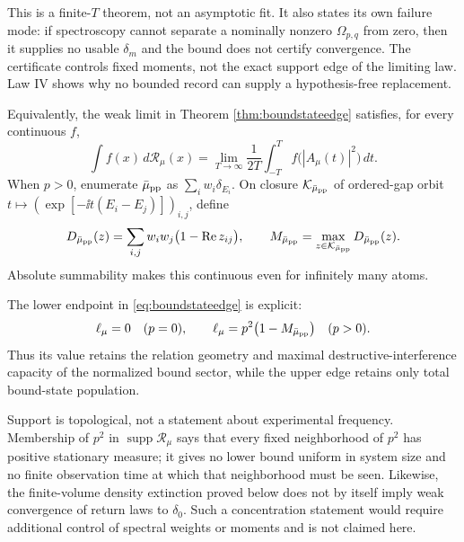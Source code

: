 This is a finite-$T$ theorem, not an asymptotic fit.  It also states its own
failure mode: if spectroscopy cannot separate a nominally nonzero
$\Omega_{p,q}$ from zero, then it supplies no usable $\delta_m$ and the bound
does not certify convergence.  The certificate controls fixed moments, not
the exact support edge of the limiting law.  Law IV shows why no bounded
record can supply a hypothesis-free replacement.

Equivalently, the weak limit in Theorem \ref{thm:boundstateedge} satisfies,
for every continuous $f$,
\begin{equation}
 \int f(x)\,d\mathscr R_\mu(x)
 =\lim_{T\to\infty}\frac1{2T}\int_{-T}^{T}
    f\bigl(|A_\mu(t)|^2\bigr)\,dt .                 \label{eq:stationarylaw}
\end{equation}
When $p>0$, enumerate $\bar\mu_{\rm pp}$ as
$\sum_iw_i\delta_{E_i}$.  On closure $\mathcal K_{\bar\mu_{\rm pp}}$ of
ordered-gap orbit
$t\mapsto(\exp[-\ii t(E_i-E_j)])_{i,j}$, define
\begin{equation}
 D_{\bar\mu_{\rm pp}}(z)
 =\sum_{i,j}w_iw_j\bigl(1-\operatorname{Re}z_{ij}\bigr),
 \qquad
 M_{\bar\mu_{\rm pp}}=\max_{z\in\mathcal K_{\bar\mu_{\rm pp}}}
   D_{\bar\mu_{\rm pp}}(z).                        \label{eq:purepointdefect}
\end{equation}
Absolute summability makes this continuous even for infinitely many atoms.

The lower endpoint in \eqref{eq:boundstateedge} is explicit:
\begin{equation}
 \ell_\mu=0\quad(p=0),
 \qquad
 \ell_\mu=p^2\bigl(1-M_{\bar\mu_{\rm pp}}\bigr)\quad(p>0). \label{eq:boundstatescaling}
\end{equation}
Thus its value retains the relation geometry and maximal
destructive-interference capacity of the normalized bound sector, while the
upper edge retains only total bound-state population.

Support is topological, not a statement about experimental frequency.
Membership of $p^2$ in $\operatorname{supp}\mathscr R_\mu$ says that every
fixed neighborhood of $p^2$ has positive stationary measure; it gives no
lower bound uniform in system size and no finite observation time at which
that neighborhood must be seen.  Likewise, the finite-volume density
extinction proved below does not by itself imply weak convergence of return
laws to $\delta_0$.  Such a concentration statement would require additional
control of spectral weights or moments and is not claimed here.

